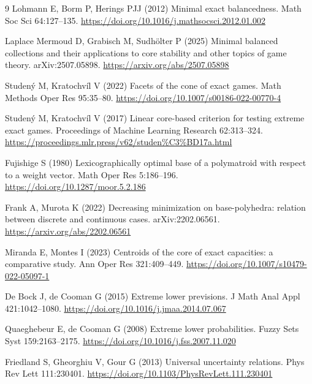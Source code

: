 \documentclass[11pt]{article}
\begin{document}
\begin{thebibliography}{9}
Lohmann E, Borm P, Herings PJJ (2012) Minimal exact balancedness.
Math Soc Sci 64:127--135.
\url{https://doi.org/10.1016/j.mathsocsci.2012.01.002}

Laplace Mermoud D, Grabisch M, Sudhölter P (2025) Minimal balanced
collections and their applications to core stability and other topics of game
theory. arXiv:2507.05898.
\url{https://arxiv.org/abs/2507.05898}

Studený M, Kratochvíl V (2022) Facets of the cone of exact games.
Math Methods Oper Res 95:35--80.
\url{https://doi.org/10.1007/s00186-022-00770-4}

\begingroup\sloppy
Studený M, Kratochvíl V (2017) Linear core-based criterion for testing
extreme exact games. Proceedings of Machine Learning Research 62:313--324.
\url{https://proceedings.mlr.press/v62/studen%C3%BD17a.html}
\par\endgroup

Fujishige S (1980) Lexicographically optimal base of a polymatroid with
respect to a weight vector. Math Oper Res 5:186--196.
\url{https://doi.org/10.1287/moor.5.2.186}

Frank A, Murota K (2022) Decreasing minimization on base-polyhedra: relation
between discrete and continuous cases. arXiv:2202.06561.
\url{https://arxiv.org/abs/2202.06561}

Miranda E, Montes I (2023) Centroids of the core of exact capacities: a
comparative study. Ann Oper Res 321:409--449.
\url{https://doi.org/10.1007/s10479-022-05097-1}

De Bock J, de Cooman G (2015) Extreme lower previsions.
J Math Anal Appl 421:1042--1080.
\url{https://doi.org/10.1016/j.jmaa.2014.07.067}

Quaeghebeur E, de Cooman G (2008) Extreme lower probabilities.
Fuzzy Sets Syst 159:2163--2175.
\url{https://doi.org/10.1016/j.fss.2007.11.020}

Friedland S, Gheorghiu V, Gour G (2013) Universal uncertainty relations.
Phys Rev Lett 111:230401.
\url{https://doi.org/10.1103/PhysRevLett.111.230401}


\end{thebibliography}
\end{document}
